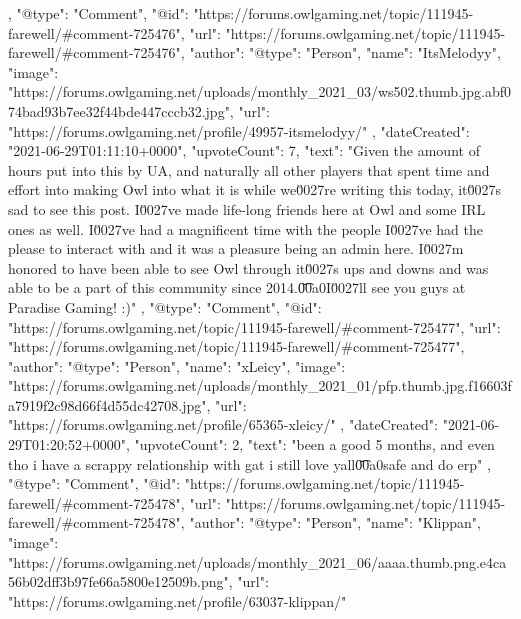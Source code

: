 {{        },
        {
            "@type": "Comment",
            "@id": "https://forums.owlgaming.net/topic/111945-farewell/#comment-725476",
            "url": "https://forums.owlgaming.net/topic/111945-farewell/#comment-725476",
            "author": {
                "@type": "Person",
                "name": "ItsMelodyy",
                "image": "https://forums.owlgaming.net/uploads/monthly_2021_03/ws502.thumb.jpg.abf074bad93b7ee32f44bde447cccb32.jpg",
                "url": "https://forums.owlgaming.net/profile/49957-itsmelodyy/"
            },
            "dateCreated": "2021-06-29T01:11:10+0000",
            "upvoteCount": 7,
            "text": "Given the amount of hours put into this by UA, and naturally all other players that spent time and effort into making Owl into what it is while we\u0027re writing this today, it\u0027s sad to see this post. I\u0027ve made life-long friends here at Owl and some IRL ones as well. I\u0027ve had a magnificent time with the people I\u0027ve had the please to interact with and it was a pleasure being an admin here. I\u0027m honored to have been able to see Owl through it\u0027s ups and downs and was able to be a part of this community since 2014.\n \n\n\n\t\u00a0\n \n\n\n\tHopefully I\u0027ll see you guys at Paradise Gaming! :)\n \n"
        },
        {
            "@type": "Comment",
            "@id": "https://forums.owlgaming.net/topic/111945-farewell/#comment-725477",
            "url": "https://forums.owlgaming.net/topic/111945-farewell/#comment-725477",
            "author": {
                "@type": "Person",
                "name": "xLeicy",
                "image": "https://forums.owlgaming.net/uploads/monthly_2021_01/pfp.thumb.jpg.f16603fa7919f2c98d66f4d55dc42708.jpg",
                "url": "https://forums.owlgaming.net/profile/65365-xleicy/"
            },
            "dateCreated": "2021-06-29T01:20:52+0000",
            "upvoteCount": 2,
            "text": "been a good 5 months, and even tho i have a scrappy relationship with gat i still love yall\n \n\n\n\t\u00a0\n \n\n\n\tstay safe and do erp\n \n"
        },
        {
            "@type": "Comment",
            "@id": "https://forums.owlgaming.net/topic/111945-farewell/#comment-725478",
            "url": "https://forums.owlgaming.net/topic/111945-farewell/#comment-725478",
            "author": {
                "@type": "Person",
                "name": "Klippan",
                "image": "https://forums.owlgaming.net/uploads/monthly_2021_06/aaaa.thumb.png.e4ca56b02dff3b97fe66a5800e12509b.png",
                "url": "https://forums.owlgaming.net/profile/63037-klippan/"
}}}
